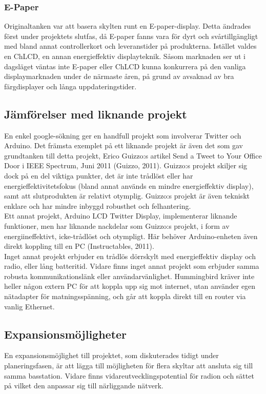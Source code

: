 \documentclass[a4paper,11pt]{article}
\begin{document}
\subsubsection{E-Paper}
Originaltanken var att basera skylten runt en E-paper-display. Detta ändrades först under projektets slutfas, då E-paper fanns vara för dyrt och svårtillgängligt med bland annat controllerkort och leveranstider på produkterna. Istället valdes en ChLCD, en annan energieffektiv displayteknik. Såsom marknaden ser ut i dagsläget väntas inte E-paper eller ChLCD kunna konkurrera på den vanliga displaymarknaden under de närmaste åren, på grund av avsaknad av bra färgdisplayer och långa uppdateringstider.

\subsection{Jämförelser med liknande projekt}
En enkel google-sökning ger en handfull projekt som involverar Twitter och Arduino. Det främsta exemplet på ett liknande projekt är även det som gav grundtanken till detta projekt, Erico Guizzo:s artikel Send a Tweet to Your Office Door i IEEE Spectrum, Juni 2011 (Guizzo, 2011). Guizzo:s projekt skiljer sig dock på en del viktiga punkter, det är inte trådlöst eller har energieffektivitetsfokus (bland annat används en mindre energieffektiv display), samt att slutprodukten är relativt otymplig. Guizzo:s projekt är även tekniskt enklare och har mindre inbyggd robusthet och felhantering. \\

Ett annat projekt, Arduino LCD Twitter Display, implementerar liknande funktioner, men har liknande nackdelar som Guizzo:s projekt, i form av energiineffektivt, icke-trådlöst och otympligt. Här behöver Arduino-enheten även direkt koppling till en PC (Instructables, 2011). \\

Inget annat projekt erbjuder en trådlös dörrskylt med energieffektiv display och radio, eller lång batteritid. Vidare finns inget annat projekt som erbjuder samma robusta kommunikationslänk eller användarvänlighet. Hummingbird kräver inte heller någon extern PC för att koppla upp sig mot internet, utan använder egen nätadapter för matningsspänning, och går att koppla direkt till en router via vanlig Ethernet. \\

\subsection{Expansionsmöjligheter}
En expansionsmöjlighet till projektet, som diskuterades tidigt under planeringsfasen, är att lägga till möjligheten för flera skyltar att ansluta sig till samma basstation. Vidare finns vidareutvecklingspotential för radion och sättet på vilket den anpassar sig till närliggande nätverk. \\
\end{document}
